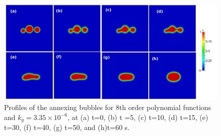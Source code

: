 \documentclass[10pt,a4paper]{article}
\begin{document}
\begin{figure}
\caption{Profiles of the annexing bubbles for 8th order polynomial functions and $k_{g}= 3.35 \times 10 ^{-6}$, at (a) t=0, (b) t =5, (c) t=10, (d) t=15, (e) t=30, (f) t=40, (g) t=50, and (h)t=60 s.}
\centering
	\includegraphics[scale=0.175]{poly8iw5pg2104}
\end{figure}
\end{document}
